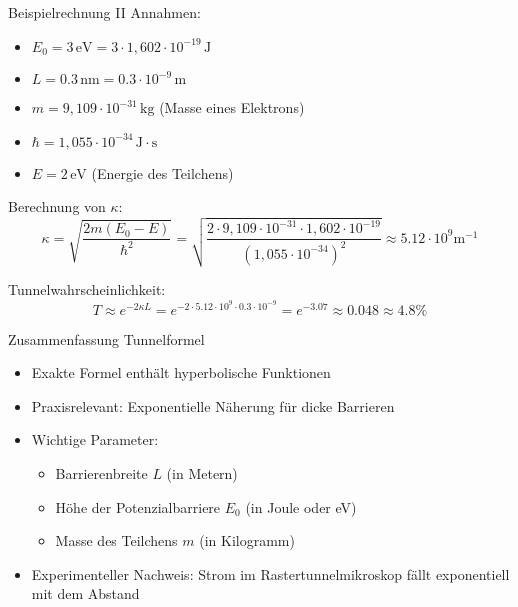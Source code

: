 \documentclass{beamer}
\begin{document}
    \begin{frame}{Beispielrechnung II}
        Annahmen:
        \begin{itemize}
            \item \( E_0 = 3 \, \text{eV} = 3 \cdot 1,602 \cdot 10^{-19} \, \text{J} \)
            \item \( L = 0.3 \, \text{nm} = 0.3 \cdot 10^{-9} \, \text{m} \)
            \item \( m = 9,109 \cdot 10^{-31} \, \text{kg} \) (Masse eines Elektrons)
            \item \( \hbar = 1,055 \cdot 10^{-34} \, \text{J} \cdot \text{s} \)
            \item \( E = 2 \, \text{eV} \) (Energie des Teilchens)
        \end{itemize}

        Berechnung von \( \kappa \):
        \[
            \kappa = \sqrt{\frac{2m(E_0 - E)}{\hbar^2}} = \sqrt{\frac{2 \cdot 9,109 \cdot 10^{-31} \cdot 1,602 \cdot 10^{-19}}{(1,055 \cdot 10^{-34})^2}} \approx 5.12 \cdot 10^9\text{m}^{-1}
        \]

        Tunnelwahrscheinlichkeit:
        \[
            T \approx e^{-2\kappa L} = e^{-2 \cdot 5.12 \cdot 10^9 \cdot 0.3 \cdot 10^{-9}} = e^{-3.07} \approx 0.048 \approx 4.8\%
        \]
    \end{frame}

    \begin{frame}{Zusammenfassung Tunnelformel}
        \begin{itemize}
            \item Exakte Formel enthält hyperbolische Funktionen
            \item Praxisrelevant: Exponentielle Näherung für dicke Barrieren
            \item Wichtige Parameter:
            \begin{itemize}
                \item Barrierenbreite \( L \) (in Metern)
                \item Höhe der Potenzialbarriere \( E_0 \) (in Joule oder eV)
                \item Masse des Teilchens \( m \) (in Kilogramm)
            \end{itemize}
            \item Experimenteller Nachweis: Strom im Rastertunnelmikroskop fällt exponentiell mit dem Abstand
        \end{itemize}
    \end{frame}
\end{document}
